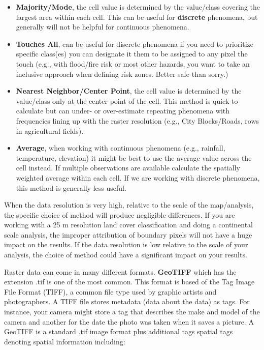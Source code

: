 \documentclass[
]{book}
\begin{document}
\begin{itemize}
\item
  \textbf{Majority/Mode}, the cell value is determined by the value/class covering the largest area within each cell. This can be useful for \textbf{discrete} phenomena, but generally will not be helpful for continuous phenomena.
\item
  \textbf{Touches All}, can be useful for discrete phenomena if you need to prioritize specific class(es) you can designate it them to be assigned to any pixel the touch (e.g., with flood/fire risk or most other hazards, you want to take an inclusive approach when defining risk zones. Better safe than sorry.)
\item
  \textbf{Nearest Neighbor/Center Point}, the cell value is determined by the value/class only at the center point of the cell. This method is quick to calculate but can under- or over-estimate repeating phenomena with frequencies lining up with the raster resolution (e.g., City Blocks/Roads, rows in agricultural fields).
\item
  \textbf{Average}, when working with continuous phenomena (e.g., rainfall, temperature, elevation) it might be best to use the average value across the cell instead. If multiple observations are available calculate the spatially weighted average within each cell. If we are working with discrete phenomena, this method is generally less useful.
\end{itemize}

When the data resolution is very high, relative to the scale of the map/analysis, the specific choice of method will produce negligible differences. If you are working with a 25 m resolution land cover classification and doing a continental scale analysis, the improper attribution of boundary pixels will not have a huge impact on the results. If the data resolution is low relative to the scale of your analysis, the choice of method could have a significant impact on your results.

Raster data can come in many different formats. \textbf{GeoTIFF} which has the extension .tif is one of the most common. This format is based of the Tag Image File Format (TIFF), a common file type used by graphic artists and photographers. A TIFF file stores metadata (data about the data) as tags. For instance, your camera might store a tag that describes the make and model of the camera and another for the date the photo was taken when it saves a picture. A GeoTIFF is a standard .tif image format plus additional tags spatial tags denoting spatial information including:
\end{document}
